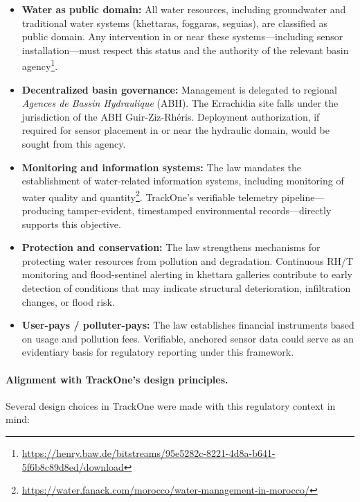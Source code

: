 \begin{itemize}[nosep]
    \item \textbf{Water as public domain:}
          All water resources, including groundwater and traditional water systems
          (khettaras, foggaras, seguias), are classified as public domain.
          Any intervention in or near these systems---including sensor installation---must
          respect this status and the authority of the relevant basin agency\footnote{\url{https://henry.baw.de/bitstreams/95e5282c-8221-4d8a-b641-5f6b8c89d8ed/download}}.
    \item \textbf{Decentralized basin governance:}
          Management is delegated to regional \emph{Agences de Bassin Hydraulique} (ABH).
    The Errachidia site falls under the jurisdiction of the
    \ac{ABH} Guir-Ziz-Rhéris.
    Deployment authorization, if required for sensor placement in or near the
    hydraulic domain, would be sought from this agency.
    \item \textbf{Monitoring and information systems:}
          The law mandates the establishment of water-related information systems,
          including monitoring of water quality and quantity\footnote{\url{https://water.fanack.com/morocco/water-management-in-morocco/}}.
          TrackOne's verifiable telemetry pipeline---producing tamper-evident,
          timestamped environmental records---directly supports this objective.
    \item \textbf{Protection and conservation:}
          The law strengthens mechanisms for protecting water resources from pollution
          and degradation.
          Continuous RH/T monitoring and flood-sentinel alerting in khettara galleries
          contribute to early detection of conditions that may indicate structural
          deterioration, infiltration changes, or flood risk.
    \item \textbf{User-pays / polluter-pays:}
          The law establishes financial instruments based on usage and pollution fees.
          Verifiable, anchored sensor data could serve as an evidentiary basis for
          regulatory reporting under this framework.
\end{itemize}

\paragraph{Alignment with TrackOne's design principles.}
Several design choices in TrackOne were made with this regulatory context in mind:


